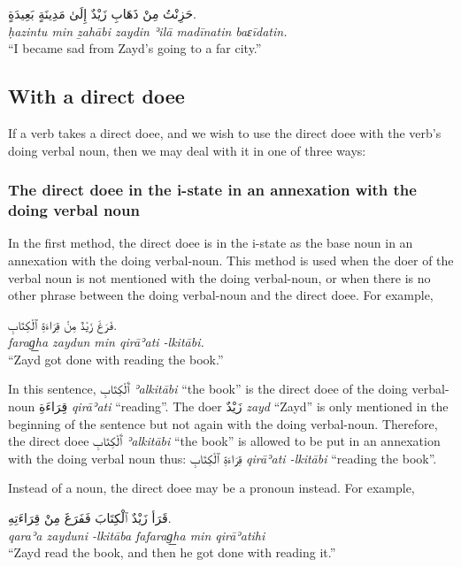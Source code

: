\documentclass[
  10pt,
]{book}
\begin{document}
\foreignlanguage{arabic}{حَزِنْتُ مِنْ ذَهَابِ زَيْدٌ إِلَىٰ مَدِينَةٍ بَعِيدَةٍ.}\\
\emph{ḥazintu min ẕahābi zaydin ʾilā madīnatin baɛīdatin.}\\
\enquote{I became sad from Zayd's going to a far city.}

\subsection{With a direct doee}\label{with-a-direct-doee}

If a verb takes a direct doee, and we wish to use the direct doee with the verb's doing verbal noun, then we may deal with it in one of three ways:

\subsubsection{The direct doee in the i-state in an annexation with the doing verbal noun}\label{the-direct-doee-in-the-i-state-in-an-annexation-with-the-doing-verbal-noun}

In the first method, the direct doee is in the i-state as the base noun in an annexation with the doing verbal-noun. This method is used when the doer of the verbal noun is not mentioned with the doing verbal-noun, or when there is no other phrase between the doing verbal-noun and the direct doee. For example,

\foreignlanguage{arabic}{فَرَغَ زَيْدٌ مِنْ قِرَاءَةِ ٱلْکِتَابِ.}\\
\emph{farag͟ha zaydun min qirāʾati -lkitābi.}\\
\enquote{Zayd got done with reading the book.}

In this sentence, \foreignlanguage{arabic}{ٱَلْکِتَابِ} \emph{ʾalkitābi} \enquote{the book} is the direct doee of the doing verbal-noun \foreignlanguage{arabic}{قِرَاءَةِ} \emph{qirāʾati} \enquote{reading}. The doer \foreignlanguage{arabic}{زَيْدٌ} \emph{zayd} \enquote{Zayd} is only mentioned in the beginning of the sentence but not again with the doing verbal-noun. Therefore, the direct doee \foreignlanguage{arabic}{ٱَلْکِتَابِ} \emph{ʾalkitābi} \enquote{the book} is allowed to be put in an annexation with the doing verbal noun thus: \foreignlanguage{arabic}{قِرَاءَةِ ٱلْکِتَابِ} \emph{qirāʾati -lkitābi} \enquote{reading the book}.

Instead of a noun, the direct doee may be a pronoun instead. For example,

\foreignlanguage{arabic}{قَرَأ زَيْدٌ ٱلْکِتَابَ فَفَرَغَ مِنْ قِرَاءَتِهِ.}\\
\emph{qaraʾa zayduni -lkitāba fafarag͟ha min qirāʾatihi}\\
\enquote{Zayd read the book, and then he got done with reading it.}
\end{document}

